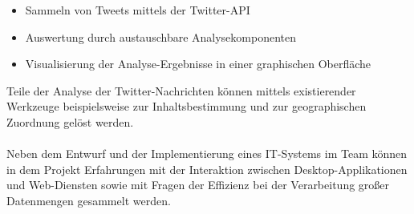 \begin{itemize}
	\item Sammeln von Tweets mittels der Twitter-API
	\item Auswertung durch austauschbare Analysekomponenten
	\item Visualisierung der Analyse-Ergebnisse in einer graphischen Oberfläche
\end{itemize}
Teile der Analyse der Twitter-Nachrichten können mittels existierender Werkzeuge beispielsweise zur Inhaltsbestimmung und zur geographischen Zuordnung gelöst werden.\\\\
Neben dem Entwurf und der Implementierung eines IT-Systems im Team können in dem Projekt Erfahrungen mit der Interaktion zwischen Desktop-Applikationen und Web-Diensten sowie mit Fragen der Effizienz bei der Verarbeitung großer Datenmengen gesammelt werden.
